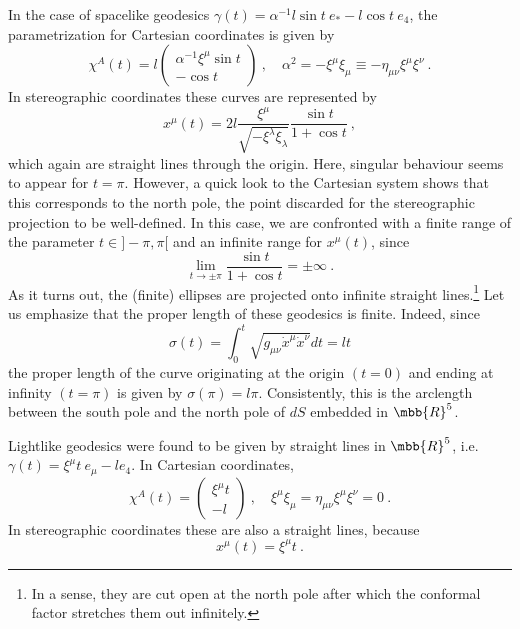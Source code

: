 \documentclass[11pt]{article}
\begin{document}
In the case of spacelike geodesics $\gamma(t) = \alpha^{-1}l\sin 
t~e_\ast - l \cos t~e_4$, the parametrization for Cartesian 
coordinates is given by
%
\begin{displaymath}
	\chi^A(t) = l
	\begin{pmatrix}
		\alpha^{-1}\xi^\mu \sin t \\
		-\cos t
	\end{pmatrix}~,
	\quad \alpha^2 = -\xi^\mu \xi_\mu \equiv -\eta_{\mu\nu} \xi^\mu 
	\xi^\nu~.
\end{displaymath}
%
In stereographic coordinates these curves are represented by
%
\begin{equation}
	x^\mu(t) = 2l \frac{\xi^\mu}{\sqrt{-\xi^\lambda\xi_\lambda}}
	\frac{\sin t}{1 + \cos t}~,
\end{equation}
which again are straight lines through the origin. Here, singular 
behaviour seems to appear for $t = \pi$. However, a quick look to 
the Cartesian system shows that this corresponds to the north 
pole, the point discarded for the stereographic projection to be 
well-defined. In this case, we are confronted with a finite range 
of the parameter $t \in ]-\pi, \pi[$ and an infinite range for 
$x^\mu(t)$, since
%
\begin{displaymath}
	\lim_{t \to \pm \pi} \frac{\sin t}{1 + \cos t} = \pm \infty~.
\end{displaymath}
As it turns out, the (finite) ellipses are projected onto 
infinite straight lines.\footnote{In a sense, they are cut open 
	at the north pole after which the conformal factor stretches 
	them out infinitely.} Let us emphasize that the proper length 
of these geodesics is finite.  Indeed, since
%
\begin{displaymath}
	\sigma(t) = \int_0^t \sqrt{g_{\mu\nu} \dot{x}^\mu \dot{x}^\nu} 
	dt = lt
\end{displaymath}
the proper length of the curve originating at the origin $(t=0)$ 
and ending at infinity $(t=\pi)$ is given by $\sigma(\pi) = 
l\pi$. Consistently, this is the arclength between the south pole 
and the north pole of $dS$ embedded in $\mbb{R}^5$.

Lightlike geodesics were found to be given by straight lines in 
$\mbb{R}^5$, i.e.\ $\gamma(t) = \xi^\mu t~e_\mu - le_4$. In 
Cartesian coordinates,
%
\begin{displaymath}
	\chi^A(t) =
	\begin{pmatrix}
		\xi^\mu t \\
		-l
	\end{pmatrix}~,
	\quad \xi^\mu\xi_\mu = \eta_{\mu\nu} \xi^\mu \xi^\nu = 0~.
\end{displaymath}
In stereographic coordinates these are also a straight lines, 
because
%
\begin{equation}
	x^\mu(t) = \xi^\mu t~.
\end{equation}



\end{document}
